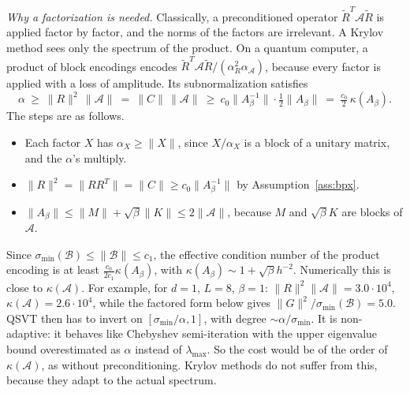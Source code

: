 \documentclass[11pt,a4paper]{article}
\newcommand{\A}{\mathcal{A}}
\newcommand{\B}{\mathcal{B}}
\newcommand{\Rt}{\widetilde R}
\theoremstyle{remark}
\begin{document}
\emph{Why a factorization is needed.} Classically, a preconditioned operator
$\Rt^T\A\Rt$ is applied factor by factor, and the norms of the factors are
irrelevant. A Krylov method sees only the spectrum of the product. On a
quantum computer, a product of block encodings encodes
$\Rt^T\A\Rt/(\alpha_R^2\alpha_\A)$, because every factor is applied with a loss of
amplitude. Its subnormalization satisfies
\begin{equation}\label{eq:naivealpha}
\alpha\ \ge\ \|R\|^2\,\|\A\|\ =\ \|C\|\,\|\A\|\ \ge\ c_0\|A_\beta^{-1}\|\cdot\tfrac12\|A_\beta\|\ =\ \tfrac{c_0}{2}\,\kappa(A_\beta).
\end{equation}
The steps are as follows.
\begin{itemize}
\item Each factor $X$ has $\alpha_X\ge\|X\|$, since $X/\alpha_X$ is a block of a
  unitary matrix, and the $\alpha$'s multiply.
\item $\|R\|^2=\|RR^T\|=\|C\|\ge c_0\|A_\beta^{-1}\|$ by Assumption~\ref{ass:bpx}.
\item $\|A_\beta\|\le\|M\|+\sqrt\beta\|K\|\le2\|\A\|$, because $M$ and $\sqrt\beta K$ are
  blocks of $\A$.
\end{itemize}
Since $\sigma_{\min}(\B)\le\|\B\|\le c_1$, the effective condition number of the
product encoding is at least $\frac{c_0}{2c_1}\kappa(A_\beta)$, with
$\kappa(A_\beta)\sim1+\sqrt\beta h^{-2}$. Numerically this is close to $\kappa(\A)$. For
example, for $d=1$, $L=8$, $\beta=1$: $\|R\|^2\|\A\|=3.0\cdot10^4$, $\kappa(\A)=2.6\cdot10^4$, while
the factored form below gives $\|G\|^2/\sigma_{\min}(\B)=5.0$. QSVT then has to
invert on $[\sigma_{\min}/\alpha,1]$, with degree $\sim\alpha/\sigma_{\min}$. It is non-adaptive:
it behaves like Chebyshev semi-iteration with the upper eigenvalue bound
overestimated as $\alpha$ instead of $\lambda_{\max}$. So the cost would be of the
order of $\kappa(\A)$, as without preconditioning. Krylov methods do not
suffer from this, because they adapt to the actual spectrum.
\end{document}
